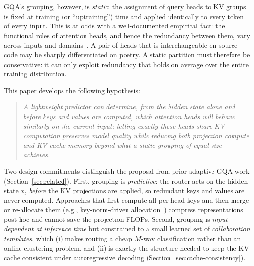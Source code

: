 \documentclass{article}
\begin{document}
GQA's grouping, however, is \emph{static}: the assignment of query heads to
KV groups is fixed at training (or ``uptraining'') time and applied
identically to every token of every input. This is at odds with a
well-documented empirical fact: the functional roles of attention heads, and
hence the redundancy between them, vary across inputs and
domains~\citep{michel2019sixteen,voita2019analyzing}. A pair of heads that is
interchangeable on source code may be sharply differentiated on poetry. A
static partition must therefore be conservative: it can only exploit
redundancy that holds on average over the entire training distribution.

This paper develops the following hypothesis:

\begin{quote}
\emph{A lightweight predictor can determine, from the hidden state alone and
before keys and values are computed, which attention heads will behave
similarly on the current input; letting exactly those heads share KV
computation preserves model quality while reducing both projection compute
and KV-cache memory beyond what a static grouping of equal size achieves.}
\end{quote}

Two design commitments distinguish the proposal from prior adaptive-GQA work
(Section~\ref{sec:related}). First, grouping is \emph{predictive}: the router
acts on the hidden state $x_t$ \emph{before} the KV projections are applied,
so redundant keys and values are never computed. Approaches that first
compute all per-head keys and then merge or re-allocate them
(e.g., key-norm-driven allocation~\citep{khan2024beyond}) compress
representations post hoc and cannot save the projection FLOPs. Second,
grouping is \emph{input-dependent at inference time} but constrained to a
small learned set of \emph{collaboration templates}, which (i) makes routing
a cheap $M$-way classification rather than an online clustering problem, and
(ii) is exactly the structure needed to keep the KV cache consistent under
autoregressive decoding (Section~\ref{sec:cache-consistency}).
\end{document}
